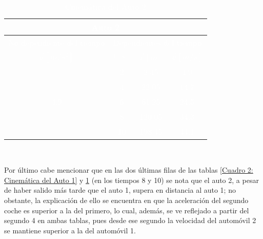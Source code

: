 \documentclass[12pt,letterpaper]{article}
\begin{document}
\begin{enumerate}
\begin{enumerate}
        \begin{table}[h]
        \centering
            \begin{tabular}{|c|c|c|c|c|c|}\hline \hline
                \multicolumn{6}{|c|}{\textcolor{white}{Auto 2}}\\\hline
                \multicolumn{3}{|l|}{\textcolor{white}{No dependiente del tiempo}} & \multicolumn{3}{|l|}{\textcolor{white}{Dependientes del tiempo}}\\\hline
                \multicolumn{3}{|c|}{\textcolor{white}{$\vec{a}[m/s^{2}]$}} & \textcolor{white}{$t[s]$} & \textcolor{white}{$\vec{x}[m]$} & \textcolor{white}{$\vec{v}[m/s]$}\\\hline
                \multicolumn{3}{|c|}{} & \textcolor{white}{2} & \textcolor{white}{2.45} & \textcolor{white}{4.9}\\\cline{4-6}
                \multicolumn{3}{|c|}{} & \textcolor{white}{4} & \textcolor{white}{22.05} & \textcolor{white}{14.7}\\\cline{4-6}
                \multicolumn{3}{|c|}{\textcolor{white}{4.9}} & \textcolor{white}{6} & \textcolor{white}{61.25} & \textcolor{white}{24.5}\\\cline{4-6}
                \multicolumn{3}{|c|}{} & \textcolor{white}{8} & \textcolor{white}{120.05} & \textcolor{white}{34.3}\\\cline{4-6}
                \multicolumn{3}{|c|}{} & \textcolor{white}{10} & \textcolor{white}{198.45} & \textcolor{white}{44.1}\\\hline \hline
            \end{tabular}\\
        \caption{\textcolor{white}{Cinemática del Auto 2}}
        \label{Cuadro 3: Cinemática del Auto 2}
        \end{table}
            
            Por último cabe mencionar que en las dos últimas filas de las tablas \ref{Cuadro 2: Cinemática del Auto 1} y \ref{Cuadro 3: Cinemática del Auto 2} (en los tiempos 8 y 10) se nota que el auto 2, a pesar de haber salido más tarde que el auto 1, supera en distancia al auto 1; no obstante, la explicación de ello se encuentra en que la aceleración del segundo coche es superior a la del primero, lo cual, además, se ve reflejado a partir del segundo 4 en ambas tablas, pues desde ese segundo la velocidad del automóvil 2 se mantiene superior a la del automóvil 1.

        \end{enumerate}


\end{enumerate}
\end{document}
